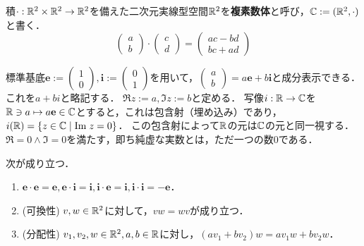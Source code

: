 \documentclass[uplatex, dvipdfmx]{jsreport}
\begin{document}
\begin{definition}\label{def-complex-numbers-1}
    積$\cdot:\mathbb{R}^2\times\mathbb{R}^2\to\mathbb{R}^2$を備えた二次元実線型空間$\mathbb{R}^2$を\textbf{複素数体}と呼び，$\mathbb{C}:=(\mathbb{R}^2,\cdot)$と書く．
    \[\begin{pmatrix}a\\b\end{pmatrix}\cdot\begin{pmatrix}c\\d\end{pmatrix}=\begin{pmatrix}ac-bd\\bc+ad\end{pmatrix}\]

    標準基底$\mathbf{e}:=\begin{pmatrix}1\\0\end{pmatrix},\mathbf{i}:=\begin{pmatrix}0\\1\end{pmatrix}$を用いて，$\begin{pmatrix}a\\b\end{pmatrix}=a\mathbf{e}+b\mathbf{i}$と成分表示できる．これを$a+bi$と略記する．
    $\Re z:=a, \Im z:=b$と定める．
    写像$i:\mathbb{R}\to\mathbb{C}$を$\mathbb{R}\ni a\mapsto a\mathbf{e}\in\mathbb{C}$とすると，これは包含射（埋め込み）であり，$i(\mathbb{R})=\{z\in\mathbb{C}\mid\mathrm{Im}\; z=0\}$．
    この包含射によって$\mathbb{R}$の元は$\mathbb{C}$の元と同一視する．
    $\Re=0\land\Im=0$を満たす，即ち純虚な実数とは，ただ一つの数$0$である．
\end{definition}
\begin{lemma}
    次が成り立つ．
    \begin{enumerate}
        \item $\mathbf{e\cdot e=e, e\cdot i=i, i\cdot e=i, i\cdot i=-e}$．
        \item(可換性) $v,w\in\mathbb{R}^2$に対して，$vw=wv$が成り立つ．
        \item(分配性) $v_1,v_2,w\in\mathbb{R}^2,a,b\in\mathbb{R}$に対し，$(av_1+bv_2)w=av_1w+bv_2w$．
    \end{enumerate}
\end{lemma}
\end{document}
